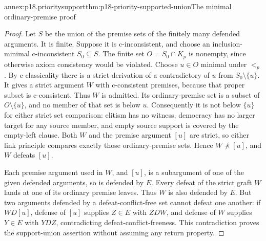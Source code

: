 \begin{annexitem}{annex:p18.prioritysupport}{thm:p18-priority-supported-union}{The minimal ordinary-premise proof}
\begin{proof}
Let \(S\) be the union of the premise sets of the finitely many defended
arguments. It is finite. Suppose it is c-inconsistent, and choose
an inclusion-minimal c-inconsistent \(S_0\subseteq S\).
The finite set \(O=S_0\cap K_p\) is nonempty, since otherwise
axiom consistency would be violated.
Choose \(u\in O\) minimal under \(<_p\).
By c-classicality there is a strict derivation of a contradictory
of \(u\) from \(S_0\setminus\{u\}\).
It gives a strict argument \(W\) with c-consistent premises, because
that proper subset is c-consistent. Thus \(W\) is admitted.
Its ordinary-premise set is a subset of \(O\setminus\{u\}\),
and no member of that set is below \(u\).
Consequently it is not below \(\{u\}\) for either strict set comparison:
elitism has no witness, democracy has no larger target for any source
member, and empty source support is covered by the empty-left clause.
Both \(W\) and the premise argument \([u]\) are strict, so either link
principle compares exactly those ordinary-premise sets.
Hence \(W\not\prec[u]\), and \(W\) defeats \([u]\).

Each premise argument used in \(W\), and \([u]\), is a subargument
of one of the given defended arguments, so is defended by \(E\).
Every defeat of the strict graft \(W\) lands at one of its ordinary
premise leaves. Thus \(W\) is also defended by \(E\).
But two arguments defended by a defeat-conflict-free set cannot defeat
one another: if \(W D[u]\), defense of \([u]\) supplies \(Z\in E\)
with \(Z D W\), and defense of \(W\) supplies \(Y\in E\) with
\(Y D Z\), contradicting defeat-conflict-freeness.
This contradiction proves the support-union assertion without assuming
any return property.
\end{proof}
\end{annexitem}

